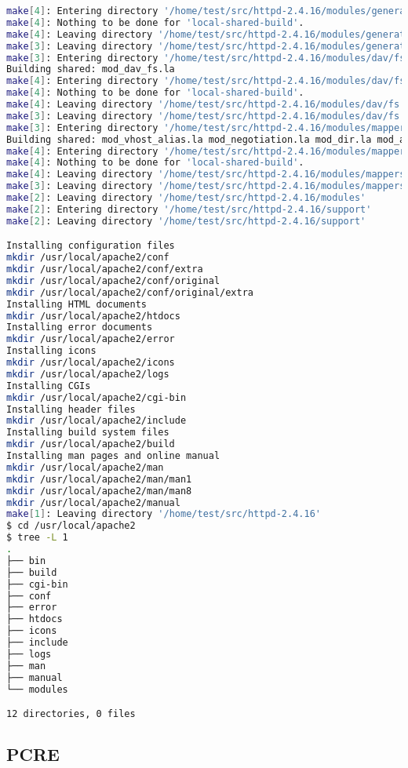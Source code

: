 \begin{lstlisting}[language=bash]
make[4]: Entering directory '/home/test/src/httpd-2.4.16/modules/generators'
make[4]: Nothing to be done for 'local-shared-build'.
make[4]: Leaving directory '/home/test/src/httpd-2.4.16/modules/generators'
make[3]: Leaving directory '/home/test/src/httpd-2.4.16/modules/generators'
make[3]: Entering directory '/home/test/src/httpd-2.4.16/modules/dav/fs'
Building shared: mod_dav_fs.la
make[4]: Entering directory '/home/test/src/httpd-2.4.16/modules/dav/fs'
make[4]: Nothing to be done for 'local-shared-build'.
make[4]: Leaving directory '/home/test/src/httpd-2.4.16/modules/dav/fs'
make[3]: Leaving directory '/home/test/src/httpd-2.4.16/modules/dav/fs'
make[3]: Entering directory '/home/test/src/httpd-2.4.16/modules/mappers'
Building shared: mod_vhost_alias.la mod_negotiation.la mod_dir.la mod_actions.la mod_speling.la mod_userdir.la mod_alias.la mod_rewrite.la
make[4]: Entering directory '/home/test/src/httpd-2.4.16/modules/mappers'
make[4]: Nothing to be done for 'local-shared-build'.
make[4]: Leaving directory '/home/test/src/httpd-2.4.16/modules/mappers'
make[3]: Leaving directory '/home/test/src/httpd-2.4.16/modules/mappers'
make[2]: Leaving directory '/home/test/src/httpd-2.4.16/modules'
make[2]: Entering directory '/home/test/src/httpd-2.4.16/support'
make[2]: Leaving directory '/home/test/src/httpd-2.4.16/support'

Installing configuration files
mkdir /usr/local/apache2/conf
mkdir /usr/local/apache2/conf/extra
mkdir /usr/local/apache2/conf/original
mkdir /usr/local/apache2/conf/original/extra
Installing HTML documents
mkdir /usr/local/apache2/htdocs
Installing error documents
mkdir /usr/local/apache2/error
Installing icons
mkdir /usr/local/apache2/icons
mkdir /usr/local/apache2/logs
Installing CGIs
mkdir /usr/local/apache2/cgi-bin
Installing header files
mkdir /usr/local/apache2/include
Installing build system files
mkdir /usr/local/apache2/build
Installing man pages and online manual
mkdir /usr/local/apache2/man
mkdir /usr/local/apache2/man/man1
mkdir /usr/local/apache2/man/man8
mkdir /usr/local/apache2/manual
make[1]: Leaving directory '/home/test/src/httpd-2.4.16'
$ cd /usr/local/apache2
$ tree -L 1
.
├── bin
├── build
├── cgi-bin
├── conf
├── error
├── htdocs
├── icons
├── include
├── logs
├── man
├── manual
└── modules

12 directories, 0 files
\end{lstlisting}




\subsection{PCRE}


